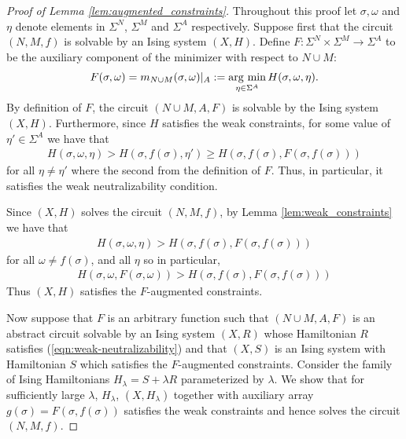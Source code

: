 \documentclass{article}
\begin{document}
\begin{proof}[Proof of Lemma \ref{lem:augmented_constraints}]
  Throughout this proof let $\sigma, \omega$ and $\eta$ denote elements in $\Sigma^N$, $\Sigma^M$ and $\Sigma^A$ respectively. Suppose first that the circuit $(N, M, f)$ is solvable by an Ising system $(X, H)$. Define $F:\Sigma^N\times \Sigma^M \to \Sigma^A$ to be the auxiliary component of the minimizer with respect to $N\cup M$:
  \begin{align*}
    F(\sigma, \omega) = m_{N\cup M}(\sigma, \omega)|_A := \operatorname*{arg ~ min}_{\eta\in \Sigma^A} H(\sigma, \omega, \eta).
  \end{align*}
  By definition of $F$, the circuit $(N\cup M, A, F)$ is solvable by the Ising system $(X, H)$. Furthermore, since $H$ satisfies the weak constraints, for some value of $\eta' \in \Sigma^A$ we have that
  \begin{align*}
    H(\sigma, \omega, \eta) > H(\sigma, f(\sigma), \eta') \geq H(\sigma, f(\sigma), F(\sigma, f(\sigma)))
  \end{align*}
  for all $\eta \neq \eta'$ where the second from the definition of $F$. Thus, in particular, it satisfies the weak neutralizability condition.

  Since $(X,H)$ solves the circuit $(N, M, f)$, by Lemma \ref{lem:weak_constraints} we have that
  \begin{align*}
    H(\sigma, \omega, \eta) > H(\sigma, f(\sigma), F(\sigma, f(\sigma)))
  \end{align*}
  for all $\omega \neq f(\sigma)$, and all $\eta$ so in particular,
  \begin{align*}
    H(\sigma, \omega, F(\sigma, \omega)) > H(\sigma, f(\sigma), F(\sigma, f(\sigma)))
  \end{align*}
  Thus $(X, H)$ satisfies the $F$-augmented constraints.

  \vspace{1.5em}

  Now suppose that $F$ is an arbitrary function such that $(N\cup M, A, F)$ is an abstract circuit solvable by an Ising system $(X, R)$ whose Hamiltonian $R$ satisfies (\ref{eqn:weak-neutralizability}) and that $(X,S)$ is an Ising system with Hamiltonian $S$ which satisfies the $F$-augmented constraints. Consider the family of Ising Hamiltonians $H_\lambda = S + \lambda R$ parameterized by $\lambda$. We show that for sufficiently large $\lambda$, $H_\lambda$, $(X,H_\lambda)$ together with auxiliary array $g(\sigma) = F(\sigma, f(\sigma))$ satisfies the weak constraints and hence solves the circuit $(N,M,f)$.


\end{proof}
\end{document}
